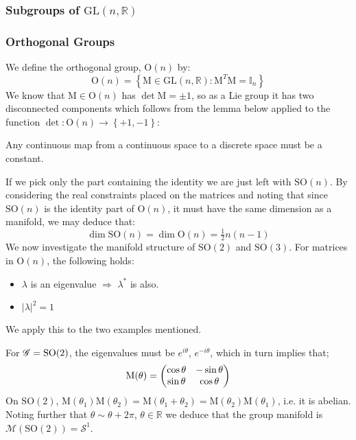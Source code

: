 \subsubsection{Subgroups of $\textrm{GL} \left( n, \mathbb{R} \right)$}

\subsubsection*{Orthogonal Groups}

We define the orthogonal group, $\textrm{O}(n)$ by:
\begin{equation}
\textrm{O}(n) = \left\{ \textrm{M} \in \textrm{GL} \left( n, \mathbb{R} \right) : \textrm{M}^T \textrm{M} = \mathbb{I}_n \right\}
\end{equation}
We know that $\textrm{M} \in \textrm{O}(n)$ has $\det \textrm{M} = \pm 1$, so as a Lie group it has two disconnected components which follows from the lemma below applied to the function $\det : \textrm{O}(n) \rightarrow \left\{+1, -1\right\}$:
\begin{thm}\label{thm:cts}
Any continuous map from a continuous space to a discrete space must be a constant.
\end{thm}
If we pick only the part containing the identity we are just left with $\textrm{SO}(n)$. By considering the real constraints placed on the matrices and noting that since $\textrm{SO}(n)$ is the identity part of $\textrm{O}(n)$, it must have the same dimension as a manifold, we may deduce that:
\begin{equation}
\dim \textrm{SO}(n) = \dim \textrm{O}(n) = \tfrac{1}{2}n(n-1)
\end{equation}
We now investigate the manifold structure of $\textrm{SO}(2)$ and $\textrm{SO}(3)$. For matrices in $\textrm{O}(n)$, the following holds:
\begin{itemize}
\item $\lambda$ is an eigenvalue $\Rightarrow$ $\lambda^*$ is also.
\item $\left| \lambda \right|^2 = 1$
\end{itemize}
We apply this to the two examples mentioned.
\begin{examplebox}[$\textrm{SO}(2)$]
For $\mathscr{G} = \textrm{SO}(2)$, the eigenvalues must be $e^{i \theta}$, $e^{-i \theta}$, which in turn implies that;
\begin{equation}
\textrm{M}(\theta) = \begin{pmatrix}\cos\theta&-\sin\theta \\ \sin\theta&\cos\theta \end{pmatrix}
\end{equation}
On $\textrm{SO}(2)$, $\textrm{M}(\theta_1)\textrm{M}(\theta_2) = \textrm{M}(\theta_1 + \theta_2) = \textrm{M}(\theta_2)\textrm{M}(\theta_1)$, i.e. it is abelian. Noting further that $\theta \sim \theta + 2\pi$, $\theta \in \mathbb{R}$ we deduce that the group manifold is $\mathcal{M}\left( \textrm{SO}(2) \right) = \mathcal{S}^1$.
\end{examplebox}
